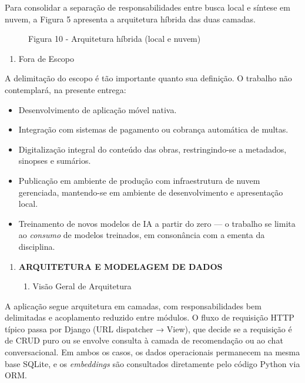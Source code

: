\documentclass[
]{article}
\begin{document}
Para consolidar a separação de responsabilidades entre busca local e
síntese em nuvem, a Figura 5 apresenta a arquitetura híbrida das duas
camadas.

\begin{figure}
\centering

\caption{Figura 10 - Arquitetura híbrida (local e nuvem)}
\end{figure}

\begin{enumerate}
\def\labelenumi{\arabic{enumi}.}
\item
  \protect{}\label{_Toc230227823}{}Fora de Escopo
\end{enumerate}

A delimitação do escopo é tão importante quanto sua definição. O
trabalho não contemplará, na presente entrega:

\begin{itemize}
\item
  Desenvolvimento de aplicação móvel nativa.
\item
  Integração com sistemas de pagamento ou cobrança automática de multas.
\item
  Digitalização integral do conteúdo das obras, restringindo-se a
  metadados, sinopses e sumários.
\item
  Publicação em ambiente de produção com infraestrutura de nuvem
  gerenciada, mantendo-se em ambiente de desenvolvimento e apresentação
  local.
\item
  Treinamento de novos modelos de IA a partir do zero --- o trabalho se
  limita ao \emph{consumo} de modelos treinados, em consonância com a
  ementa da disciplina.
\end{itemize}

\begin{enumerate}
\def\labelenumi{\arabic{enumi}.}
\setcounter{enumi}{5}
\item
  \protect{}\label{_Toc230227824}{}\textbf{ARQUITETURA E
  MODELAGEM DE DADOS}

  \begin{enumerate}
  \def\labelenumii{\arabic{enumii}.}
  \item
    \protect{}\label{_Toc230227825}{}Visão Geral de
    Arquitetura
  \end{enumerate}
\end{enumerate}

A aplicação segue arquitetura em camadas, com responsabilidades bem
delimitadas e acoplamento reduzido entre módulos. O fluxo de requisição
HTTP típico passa por Django (URL dispatcher → View), que decide se a
requisição é de CRUD puro ou se envolve consulta à camada de
recomendação ou ao chat conversacional. Em ambos os casos, os dados
operacionais permanecem na mesma base SQLite, e os \emph{embeddings} são
consultados diretamente pelo código Python via ORM.
\end{document}
